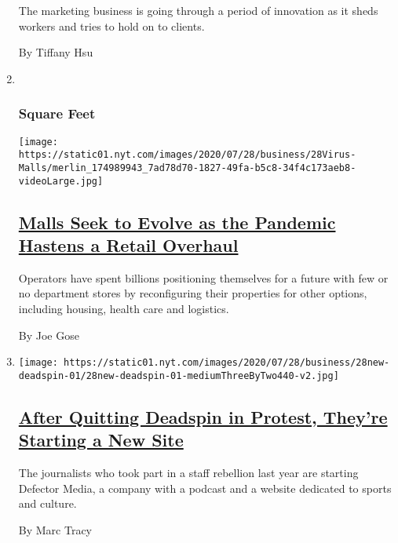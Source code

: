 \begin{enumerate}
  The marketing business is going through a period of innovation as it
  sheds workers and tries to hold on to clients.

  By Tiffany Hsu
\item ~
  \hypertarget{square-feet}{%
  \subsubsection{Square Feet}\label{square-feet}}

  \texttt{[image: https://static01.nyt.com/images/2020/07/28/business/28Virus-Malls/merlin\_174989943\_7ad78d70-1827-49fa-b5c8-34f4c173aeb8-videoLarge.jpg]}

  \hypertarget{malls-seek-to-evolve-as-the-pandemic-hastens-a-retail-overhaul}{%
  \subsection{\texorpdfstring{\href{/2020/07/28/business/malls-coronavirus.html}{Malls
  Seek to Evolve as the Pandemic Hastens a Retail
  Overhaul}}{Malls Seek to Evolve as the Pandemic Hastens a Retail Overhaul}}\label{malls-seek-to-evolve-as-the-pandemic-hastens-a-retail-overhaul}}

  Operators have spent billions positioning themselves for a future with
  few or no department stores by reconfiguring their properties for
  other options, including housing, health care and logistics.

  By Joe Gose
\item
  \texttt{[image: https://static01.nyt.com/images/2020/07/28/business/28new-deadspin-01/28new-deadspin-01-mediumThreeByTwo440-v2.jpg]}

  \hypertarget{after-quitting-deadspin-in-protest-theyre-starting-a-new-site}{%
  \subsection{\texorpdfstring{\href{/2020/07/28/business/media/deadspin-staffers-start-defector.html}{After
  Quitting Deadspin in Protest, They're Starting a New
  Site}}{After Quitting Deadspin in Protest, They're Starting a New Site}}\label{after-quitting-deadspin-in-protest-theyre-starting-a-new-site}}

  The journalists who took part in a staff rebellion last year are
  starting Defector Media, a company with a podcast and a website
  dedicated to sports and culture.

  By Marc Tracy
\end{enumerate}

